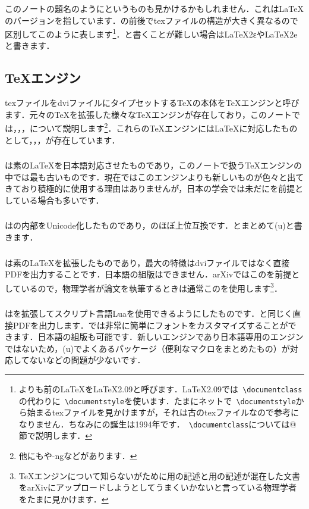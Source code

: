 このノートの題名のように\LaTeXe というものも見かけるかもしれません．これは\LaTeX のバージョンを指しています．\LaTeXe の前後でtexファイルの構造が大きく異なるので区別してこのように表します\footnote{\LaTeXe よりも前の\LaTeX を\LaTeX 2.09と呼びます．\LaTeX 2.09では\texttt{\,\backslash documentclass}の代わりに\texttt{\,\backslash documentstyle}を使います．たまにネットで\texttt{\,\backslash documentstyle}から始まるtexファイルを見かけますが，それは古のtexファイルなので参考になりません．ちなみに\LaTeXe の誕生は1994年です．\texttt{\,\backslash documentclass}については@節で説明します．}．\LaTeXe と書くことが難しい場合はLaTeX2εやLaTeX2eと書きます．

\subsection{\TeX エンジン}
texファイルをdviファイルにタイプセットする\TeX の本体を\TeX エンジンと呼びます．元々の\TeX を拡張した様々な\TeX エンジンが存在しており，このノートでは\pTeX ，\upTeX ，\pdfTeX ，\LuaTeX について説明します\footnote{他にも\XeTeX や\pTeX-ngなどがあります．}．これらの\TeX エンジンには\LaTeX に対応したものとして\pLaTeX ，\upLaTeX ，\pdfLaTeX ，\LuaLaTeX が存在しています．

\subsubsection*{\pLaTeX}
\pLaTeX は素の\LaTeX を日本語対応させたものであり，このノートで扱う\TeX エンジンの中では最も古いものです．現在ではこのエンジンよりも新しいものが色々と出てきており積極的に使用する理由はありませんが，日本の学会では未だに\pLaTeX を前提としている場合も多いです．

\subsubsection*{\upLaTeX}
\upLaTeX は\pLaTeX の内部をUnicode化したものであり，\pLaTeX のほぼ上位互換です．\pLaTeX とまとめて(u)\pLaTeX と書きます．

\subsubsection*{\pdfLaTeX}
\pdfLaTeX は素の\LaTeX を拡張したものであり，最大の特徴はdviファイルではなく直接PDFを出力することです．日本語の組版はできません．arXivではこの\pdfLaTeX を前提としているので，物理学者が論文を執筆するときは通常この\pdfLaTeX を使用します\footnote{\TeX エンジンについて知らないがために\pdfLaTeX 用の記述と\pLaTeX 用の記述が混在した文書をarXivにアップロードしようとしてうまくいかないと言っている物理学者をたまに見かけます．}．

\subsubsection*{\LuaLaTeX}
\LuaLaTeX は\pdfLaTeX を拡張してスクリプト言語Luaを使用できるようにしたものです．\pdfLaTeX と同じく直接PDFを出力します．\LuaLaTeX では非常に簡単にフォントをカスタマイズすることができます．日本語の組版も可能です．新しいエンジンであり日本語専用のエンジンではないため，(u)\pLaTeX でよくあるパッケージ（便利なマクロをまとめたもの）が対応してないなどの問題が少ないです．